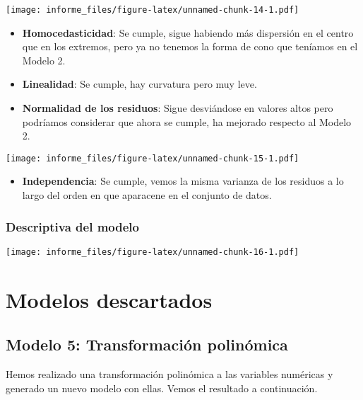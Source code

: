 \documentclass[
]{article}
\providecommand{\tightlist}{%
  \setlength{\itemsep}{0pt}\setlength{\parskip}{0pt}}
\begin{document}
\texttt{[image: informe\_files/figure-latex/unnamed-chunk-14-1.pdf]}

\begin{itemize}
\tightlist
\item
  \textbf{Homocedasticidad}: Se cumple, sigue habiendo más dispersión en
  el centro que en los extremos, pero ya no tenemos la forma de cono que
  teníamos en el Modelo 2.
\item
  \textbf{Linealidad}: Se cumple, hay curvatura pero muy leve.
\item
  \textbf{Normalidad de los residuos}: Sigue desviándose en valores
  altos pero podríamos considerar que ahora se cumple, ha mejorado
  respecto al Modelo 2.
\end{itemize}

\texttt{[image: informe\_files/figure-latex/unnamed-chunk-15-1.pdf]}

\begin{itemize}
\tightlist
\item
  \textbf{Independencia}: Se cumple, vemos la misma varianza de los
  residuos a lo largo del orden en que aparacene en el conjunto de
  datos.
\end{itemize}

\hypertarget{descriptiva-del-modelo}{%
\subsubsection{Descriptiva del modelo}\label{descriptiva-del-modelo}}

\texttt{[image: informe\_files/figure-latex/unnamed-chunk-16-1.pdf]}

\hypertarget{modelos-descartados}{%
\section{Modelos descartados}\label{modelos-descartados}}

\hypertarget{modelo-5-transformaciuxf3n-polinuxf3mica}{%
\subsection{Modelo 5: Transformación
polinómica}\label{modelo-5-transformaciuxf3n-polinuxf3mica}}

Hemos realizado una transformación polinómica a las variables numéricas
y generado un nuevo modelo con ellas. Vemos el resultado a continuación.
\end{document}
